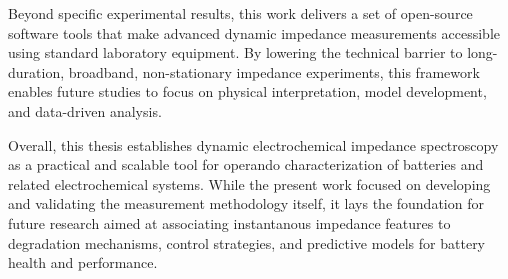 Beyond specific experimental results, this work delivers a set of open-source software tools that make advanced dynamic impedance measurements accessible using standard laboratory equipment. 
By lowering the technical barrier to long-duration, broadband, non-stationary impedance experiments, this framework enables future studies to focus on physical interpretation, model development, and data-driven analysis.

Overall, this thesis establishes dynamic electrochemical impedance spectroscopy as a practical and scalable tool for operando characterization of batteries and related electrochemical systems. 
While the present work focused on developing and validating the measurement methodology itself, it lays the foundation for future research aimed at associating instantanous impedance features to degradation mechanisms, control strategies, and predictive models for battery health and performance.







